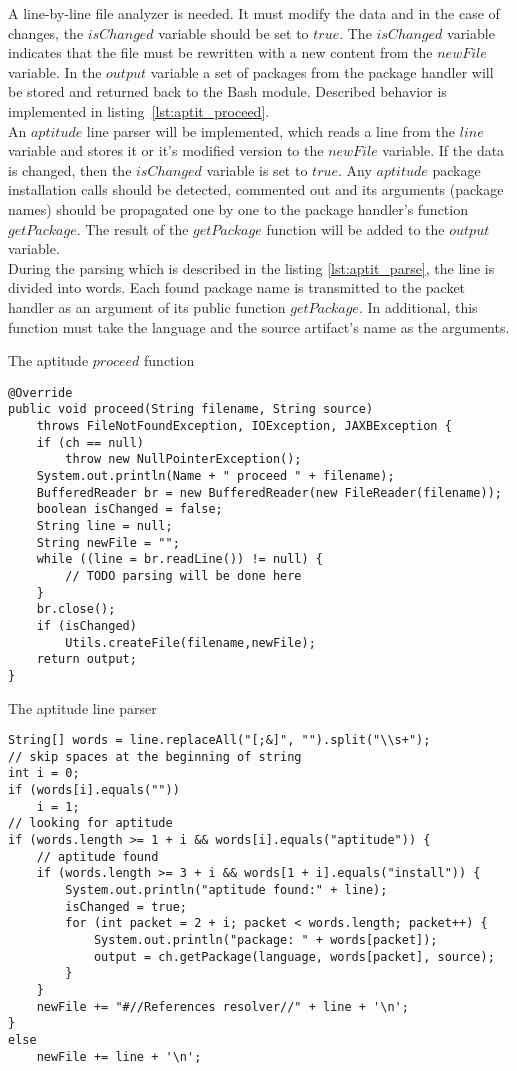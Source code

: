 A line-by-line file analyzer is needed.
It must modify the data and in the case of changes, the $isChanged$ variable should be set to $true$.
The $isChanged$ variable indicates that the file must be rewritten with a new content from the $newFile$ variable.
In the $output$ variable a set of packages from the package handler will be stored and returned back to the Bash module.
Described behavior is implemented in listing~\ref{lst:aptit_proceed}.\\
An $aptitude$ line parser will be implemented, which reads a line from the $line$ variable and stores it or it's modified version to the $newFile$ variable.
If the data is changed, then the $isChanged$ variable is set to $true$.
Any $aptitude$ package installation calls should be detected, commented out and its arguments (package names) should be propagated one by one to the package handler's function $getPackage$. 
The result of the $getPackage$ function will be added to the $output$ variable.\\
During the parsing which is described in the listing \ref{lst:aptit_parse}, the line is divided into words. 
Each found package name is transmitted to the packet handler as an argument of its public function $getPackage$.
In additional, this function must take the language and the source artifact's name as the arguments.
\begin{Listing} 
\caption{The aptitude $proceed$ function}
\label{lst:aptit_proceed}
\begin{lstlisting}
@Override
public void proceed(String filename, String source)
	throws FileNotFoundException, IOException, JAXBException {
	if (ch == null)
		throw new NullPointerException();
	System.out.println(Name + " proceed " + filename);
	BufferedReader br = new BufferedReader(new FileReader(filename));
	boolean isChanged = false;
	String line = null;
	String newFile = "";
	while ((line = br.readLine()) != null) {
		// TODO parsing will be done here
	}
	br.close();
	if (isChanged)
		Utils.createFile(filename,newFile);
	return output;
}	 
\end{lstlisting}
\end{Listing} 
\begin{Listing} 
\caption{The aptitude line parser}
\label{lst:aptit_parse}
\begin{lstlisting}
String[] words = line.replaceAll("[;&]", "").split("\\s+");
// skip spaces at the beginning of string
int i = 0;
if (words[i].equals(""))
	i = 1;
// looking for aptitude 
if (words.length >= 1 + i && words[i].equals("aptitude")) {
	// aptitude found
	if (words.length >= 3 + i && words[1 + i].equals("install")) {
		System.out.println("aptitude found:" + line);
		isChanged = true;
		for (int packet = 2 + i; packet < words.length; packet++) {
			System.out.println("package: " + words[packet]);
			output = ch.getPackage(language, words[packet], source);
		}
	}
	newFile += "#//References resolver//" + line + '\n';
} 
else
	newFile += line + '\n';
\end{lstlisting}
\end{Listing} 
